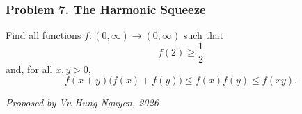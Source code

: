 \subsubsection*{Problem 7. The Harmonic Squeeze}

\begin{exercisebox}[medium]

Find all functions $f:(0,\infty)\to(0,\infty)$ such that
\[
f(2)\ge \frac12
\]
and, for all $x,y>0$,
\[
f(x+y)\bigl(f(x)+f(y)\bigr)
\le f(x)f(y)
\le f(xy).
\]

\begin{flushright}
\textit{Proposed by Vu Hung Nguyen, 2026}
\end{flushright}


\end{exercisebox}